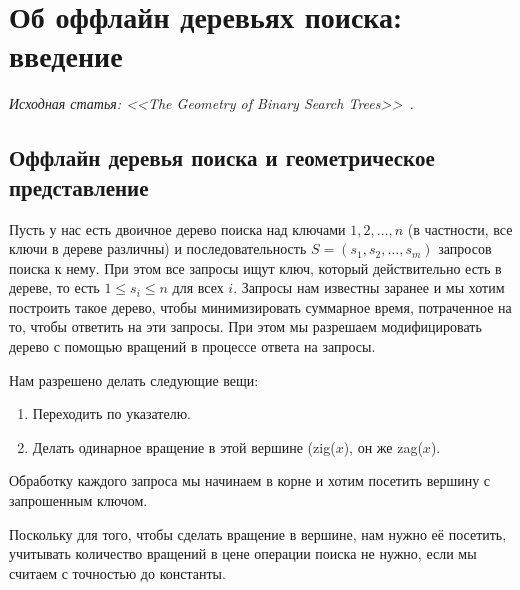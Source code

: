 \section{Об оффлайн деревьях поиска: введение}


{\it Исходная статья: <<The Geometry of Binary Search Trees>>~\cite{demaine2009geometry}.}

\subsection{Оффлайн деревья поиска и геометрическое представление}

Пусть у нас есть двоичное дерево поиска над ключами $1, 2, \ldots, n$ (в частности, все ключи в дереве различны) и последовательность $S = (s_1, s_2, \ldots, s_m)$ запросов поиска к нему.
При этом все запросы ищут ключ, который действительно есть в дереве, то есть $1 \leqslant s_i \leqslant n$ для всех $i$. Запросы нам известны заранее и мы хотим построить такое дерево, чтобы минимизировать суммарное время, потраченное на то, чтобы ответить на эти запросы.
При этом мы разрешаем модифицировать дерево с помощью вращений в процессе
ответа на запросы.

Нам разрешено делать следующие вещи:
\begin{enumerate}
	\item Переходить по указателю.
	\item Делать одинарное вращение в этой вершине (\textrm{zig}($x$), он же \textrm{zag}($x$).
\end{enumerate}

Обработку каждого запроса мы начинаем в корне и хотим посетить вершину с запрошенным ключом.



\begin{remark}
	Поскольку для того, чтобы сделать вращение в вершине, нам нужно её посетить, учитывать количество вращений в цене операции поиска не нужно, если мы считаем с точностью до константы.
\end{remark}



